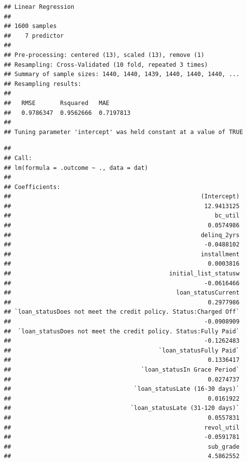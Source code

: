 \documentclass[]{article}
\newenvironment{Shaded}{\begin{snugshade}}{\end{snugshade}}
\newcommand{\NormalTok}[1]{#1}
\newcommand{\OperatorTok}[1]{\textcolor[rgb]{0.81,0.36,0.00}{\textbf{#1}}}
\begin{document}
\begin{verbatim}
## Linear Regression 
## 
## 1600 samples
##    7 predictor
## 
## Pre-processing: centered (13), scaled (13), remove (1) 
## Resampling: Cross-Validated (10 fold, repeated 3 times) 
## Summary of sample sizes: 1440, 1440, 1439, 1440, 1440, 1440, ... 
## Resampling results:
## 
##   RMSE       Rsquared   MAE      
##   0.9786347  0.9562666  0.7197813
## 
## Tuning parameter 'intercept' was held constant at a value of TRUE
\end{verbatim}

\begin{Shaded}
\end{Shaded}

\begin{verbatim}
## 
## Call:
## lm(formula = .outcome ~ ., data = dat)
## 
## Coefficients:
##                                                      (Intercept)  
##                                                       12.9413125  
##                                                          bc_util  
##                                                        0.0574986  
##                                                      delinq_2yrs  
##                                                       -0.0488102  
##                                                      installment  
##                                                        0.0003816  
##                                             initial_list_statusw  
##                                                       -0.0616466  
##                                               loan_statusCurrent  
##                                                        0.2977986  
## `loan_statusDoes not meet the credit policy. Status:Charged Off`  
##                                                       -0.0908909  
##  `loan_statusDoes not meet the credit policy. Status:Fully Paid`  
##                                                       -0.1262483  
##                                          `loan_statusFully Paid`  
##                                                        0.1336417  
##                                     `loan_statusIn Grace Period`  
##                                                        0.0274737  
##                                   `loan_statusLate (16-30 days)`  
##                                                        0.0161922  
##                                  `loan_statusLate (31-120 days)`  
##                                                        0.0557831  
##                                                       revol_util  
##                                                       -0.0591781  
##                                                        sub_grade  
##                                                        4.5862552
\end{verbatim}
\end{document}
